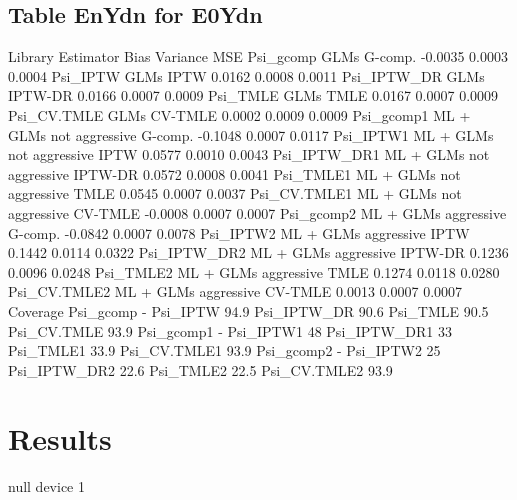 \documentclass[11pt]{article}
\begin{document}
\subsection{Table EnYdn for E0Ydn}
\begin{Schunk}
\begin{Soutput}
                              Library Estimator    Bias Variance    MSE
Psi_gcomp                        GLMs   G-comp. -0.0035   0.0003 0.0004
Psi_IPTW                         GLMs      IPTW  0.0162   0.0008 0.0011
Psi_IPTW_DR                      GLMs   IPTW-DR  0.0166   0.0007 0.0009
Psi_TMLE                         GLMs      TMLE  0.0167   0.0007 0.0009
Psi_CV.TMLE                      GLMs   CV-TMLE  0.0002   0.0009 0.0009
Psi_gcomp1   ML + GLMs not aggressive   G-comp. -0.1048   0.0007 0.0117
Psi_IPTW1    ML + GLMs not aggressive      IPTW  0.0577   0.0010 0.0043
Psi_IPTW_DR1 ML + GLMs not aggressive   IPTW-DR  0.0572   0.0008 0.0041
Psi_TMLE1    ML + GLMs not aggressive      TMLE  0.0545   0.0007 0.0037
Psi_CV.TMLE1 ML + GLMs not aggressive   CV-TMLE -0.0008   0.0007 0.0007
Psi_gcomp2       ML + GLMs aggressive   G-comp. -0.0842   0.0007 0.0078
Psi_IPTW2        ML + GLMs aggressive      IPTW  0.1442   0.0114 0.0322
Psi_IPTW_DR2     ML + GLMs aggressive   IPTW-DR  0.1236   0.0096 0.0248
Psi_TMLE2        ML + GLMs aggressive      TMLE  0.1274   0.0118 0.0280
Psi_CV.TMLE2     ML + GLMs aggressive   CV-TMLE  0.0013   0.0007 0.0007
             Coverage
Psi_gcomp           -
Psi_IPTW        94.9%
Psi_IPTW_DR     90.6%
Psi_TMLE        90.5%
Psi_CV.TMLE     93.9%
Psi_gcomp1          -
Psi_IPTW1         48%
Psi_IPTW_DR1      33%
Psi_TMLE1       33.9%
Psi_CV.TMLE1    93.9%
Psi_gcomp2          -
Psi_IPTW2         25%
Psi_IPTW_DR2    22.6%
Psi_TMLE2       22.5%
Psi_CV.TMLE2    93.9%
\end{Soutput}
\end{Schunk}


\section{Results}
\begin{Schunk}
\begin{Soutput}
null device 
          1 
\end{Soutput}
\end{Schunk}
\end{document}
